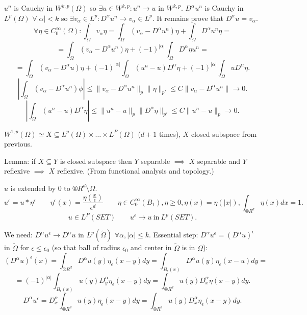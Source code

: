 \documentclass[12pt]{article}					%
\begin{document}
\break

\begin{dukaz}
	$u^n$ is Cauchy in $W^{k,p}(\Omega)$ so $\exists u \in W^{k,p}: u^n \rightarrow u$ in $W^{k,p}$. $D^\alpha u^n$ is Cauchy in $L^p(\Omega)$ $\forall |\alpha| < k$ so $\exists v_\alpha \in L^p: D^\alpha u^n \rightarrow v_\alpha \in L^p$. It remains prove that $D^\alpha u = v_\alpha$.
	$$ \forall \eta \in C_0^∞(\Omega): \int_\Omega v_\alpha \eta = \int_\Omega (v_\alpha - D^\alpha u^n)\eta + \int_\Omega D^{\alpha}u^n\eta = $$
	$$ = \int_\Omega(v_\alpha - D^\alpha u^n) \eta + (-1)^{|\alpha|} \int_\Omega D^\alpha \eta u^n = $$
	$$ = \int_\Omega(v_\alpha - D^\alpha u) \eta + (-1)^{|\alpha|} \int_\Omega(u^n - u)D^\alpha\eta + (-1)^{|\alpha|}\int_\Omega u D^\alpha \eta. $$
	$$ \left|\int_\Omega (v_\alpha - D^\alpha u^n) \phi\right| ≤ \|v_\alpha - D^\alpha u^n\|_p \|\eta\|_{p'} ≤ C \|v_\alpha - D^\alpha u^n\| \rightarrow 0. $$
	$$ \left|\int_\Omega (u^n - u) D^\alpha \eta\right| ≤ \|u^n - u\|_p \|D^\alpha \eta\|_{p'} ≤ C \|u^n - u\|_p \rightarrow 0. $$
\end{dukaz}

\begin{dukaz}
	$W^{1, p}(\Omega) \simeq X \subseteq L^p(\Omega) \times … \times L^P(\Omega)$ ($d+1$ times), $X$ closed subspace from previous.

	Lemma: if $X \subseteq Y$ is closed subspace then $Y$ separable $\implies$ $X$ separable and $Y$ reflexive $\implies$ $X$ reflexive. (From functional analysis and topology.)
\end{dukaz}

\begin{dukaz}
	$u$ is extended by 0 to $®R^d \setminus \Omega$.
	$$ u^\epsilon = u * \eta^\epsilon \qquad \eta^\epsilon(x) = \frac{\eta(\frac{x}{\epsilon})}{\epsilon^d} \qquad \eta \in C_0^∞(B_1), \eta ≥ 0, \eta(x) = \eta(|x|), \int_{®R^d}\eta(x) dx = 1. $$
	$$ u \in L^P(SET) \qquad u^\epsilon \rightarrow u\ \text{in}\ L^p(SET). $$

	We need: $D^\alpha u^\epsilon \rightarrow D^\alpha u$ in $L^p(\tilde\Omega)$ $\forall \alpha, |\alpha| ≤ k$. Essential step: $D^\alpha u^\epsilon = (D^\alpha u)^\epsilon$ in $\tilde\Omega$ for $\epsilon ≤ \epsilon_0$ (so that ball of radius $\epsilon_0$ and center in $\tilde\Omega$ is in $\Omega$):
	$$ (D^\alpha u)^\epsilon(x) = \int_{®R^d} D^\alpha u(y) \eta_\epsilon(x-y) dy = \int_{B_\epsilon(x)} D^\alpha u(y) \eta_\epsilon(x - u) dy = $$
	$$ = (-1)^{|\alpha|} \int_{B_\epsilon(x)} u(y) D^\alpha_y \eta_\epsilon(x - y) dy = \int_{®R^d} u(y) D_x^\alpha \eta(x - y) dy. $$
	$$ D^\alpha u^\epsilon = D_x^\alpha \int_{®R^d} u(y) \eta_\epsilon(x - y) dy = \int_{®R^d} u(y) D_x^\alpha \eta_\epsilon(x - y) dy. $$
\end{dukaz}
\end{document}
